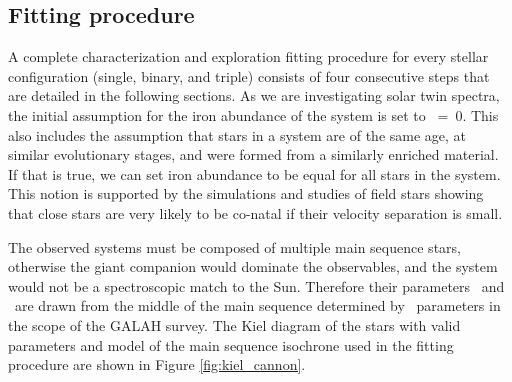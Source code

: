 \subsection{Fitting procedure}
A complete characterization and exploration fitting procedure for every stellar configuration (single, binary, and triple) consists of four consecutive steps that are detailed in the following sections. As we are investigating solar twin spectra, the initial assumption for the iron abundance of the system is set to \Feh~=~$0$. This also includes the assumption that stars in a system are of the same age, at similar evolutionary stages, and were formed from a similarly enriched material. If that is true, we can set iron abundance to be equal for all stars in the system. This notion is supported by the simulations \citep{2019arXiv190210719K} and studies \citep{2019arXiv190402159K} of field stars showing that close stars are very likely to be co-natal if their velocity separation is small.

The observed systems must be composed of multiple main sequence stars, otherwise the giant companion would dominate the observables, and the system would not be a spectroscopic match to the Sun. Therefore their parameters \Teff\ and \Logg\ are drawn from the middle of the main sequence determined by \TC\ parameters in the scope of the GALAH survey. The Kiel diagram of the stars with valid parameters and model of the main sequence isochrone used in the fitting procedure are shown in Figure \ref{fig:kiel_cannon}.

